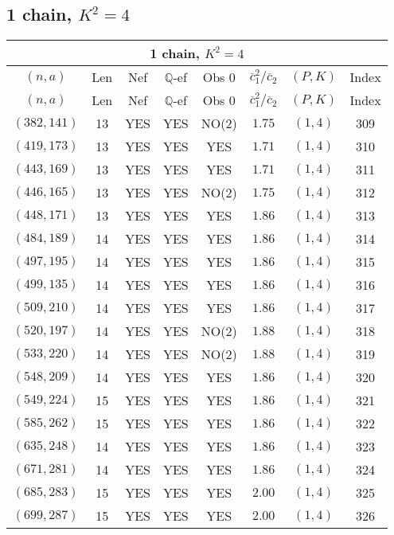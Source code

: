 \subsection{1 chain, $K^2 = 4$}
\begin{longtable}{|c|c|c|c|c|c|c|c|}
\hline
\multicolumn{8}{|c|}{1 chain, $K^2 = 4$}\\
\hline
$(n,a)$ & Len & Nef & $\mathbb Q$-ef & Obs 0 & $\overline c_1^2 / \overline c_2$ & $(P,K)$ & Index\\
\hline
\endfirsthead

\hline
$(n,a)$ & Len & Nef & $\mathbb Q$-ef & Obs 0 & $\overline c_1^2 / \overline c_2$ & $(P,K)$ & Index\\
\hline
\endhead
\hline
\endfoot

$(382,141)$ & 13 & YES & YES & NO(2) & $1.75$ & $(1,4)$ & 309\\
$(419,173)$ & 13 & YES & YES & YES & $1.71$ & $(1,4)$ & 310\\
$(443,169)$ & 13 & YES & YES & YES & $1.71$ & $(1,4)$ & 311\\
$(446,165)$ & 13 & YES & YES & NO(2) & $1.75$ & $(1,4)$ & 312\\
$(448,171)$ & 13 & YES & YES & YES & $1.86$ & $(1,4)$ & 313\\
$(484,189)$ & 14 & YES & YES & YES & $1.86$ & $(1,4)$ & 314\\
$(497,195)$ & 14 & YES & YES & YES & $1.86$ & $(1,4)$ & 315\\
$(499,135)$ & 14 & YES & YES & YES & $1.86$ & $(1,4)$ & 316\\
$(509,210)$ & 14 & YES & YES & YES & $1.86$ & $(1,4)$ & 317\\
$(520,197)$ & 14 & YES & YES & NO(2) & $1.88$ & $(1,4)$ & 318\\
$(533,220)$ & 14 & YES & YES & NO(2) & $1.88$ & $(1,4)$ & 319\\
$(548,209)$ & 14 & YES & YES & YES & $1.86$ & $(1,4)$ & 320\\
$(549,224)$ & 15 & YES & YES & YES & $1.86$ & $(1,4)$ & 321\\
$(585,262)$ & 15 & YES & YES & YES & $1.86$ & $(1,4)$ & 322\\
$(635,248)$ & 14 & YES & YES & YES & $1.86$ & $(1,4)$ & 323\\
$(671,281)$ & 14 & YES & YES & YES & $1.86$ & $(1,4)$ & 324\\
$(685,283)$ & 15 & YES & YES & YES & $2.00$ & $(1,4)$ & 325\\
$(699,287)$ & 15 & YES & YES & YES & $2.00$ & $(1,4)$ & 326\\

\end{longtable}
